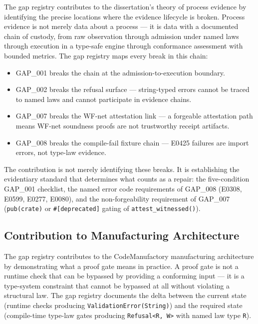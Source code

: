 The gap registry contributes to the dissertation's theory of process evidence by
identifying the precise locations where the evidence lifecycle is broken. Process
evidence is not merely data about a process — it is data with a documented chain of
custody, from raw observation through admission under named laws through execution in
a type-safe engine through conformance assessment with bounded metrics. The gap registry
maps every break in this chain:

\begin{itemize}
  \item GAP\_001 breaks the chain at the admission-to-execution boundary.
  \item GAP\_002 breaks the refusal surface — string-typed errors cannot be traced to
        named laws and cannot participate in evidence chains.
  \item GAP\_007 breaks the WF-net attestation link — a forgeable attestation path
        means WF-net soundness proofs are not trustworthy receipt artifacts.
  \item GAP\_008 breaks the compile-fail fixture chain — E0425 failures are import
        errors, not type-law evidence.
\end{itemize}

The contribution is not merely identifying these breaks. It is establishing the
evidentiary standard that determines what counts as a repair: the five-condition
GAP\_001 checklist, the named error code requirements of GAP\_008 (E0308, E0599, E0277,
E0080), and the non-forgeability requirement of GAP\_007 (\texttt{pub(crate)} or
\texttt{\#[deprecated]} gating of \texttt{attest\_witnessed()}).

\subsection{Contribution to Manufacturing Architecture}
\label{sec:gaps-contribution-manufacturing}

The gap registry contributes to the CodeManufactory manufacturing architecture by
demonstrating what a proof gate means in practice. A proof gate is not a runtime check
that can be bypassed by providing a conforming input — it is a type-system constraint
that cannot be bypassed at all without violating a structural law. The gap registry
documents the delta between the current state (runtime checks producing
\texttt{ValidationError(String)}) and the required state (compile-time type-law gates
producing \texttt{Refusal<R, W>} with named law type \texttt{R}).

